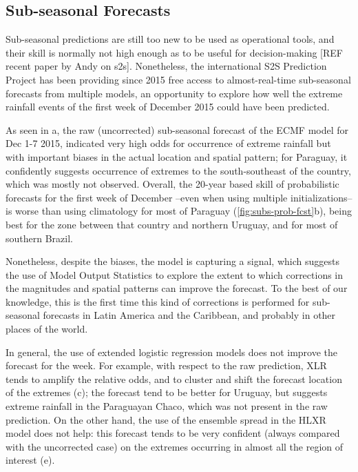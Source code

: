 \documentclass[twocol]{ametsoc}
\begin{document}
\subsection{Sub-seasonal Forecasts}
Sub-seasonal predictions are still too new to be used as operational tools, and their skill is normally not high enough as to be useful for decision-making [REF recent paper by Andy on s2s]. Nonetheless, the international S2S Prediction Project \citep{Vitart2016} has been providing since 2015 free access to almost-real-time sub-seasonal forecasts from multiple models, an opportunity to explore how well the extreme rainfall events of the first week of December 2015 could have been predicted.

As seen in a, the raw (uncorrected) sub-seasonal forecast of the ECMF model for Dec 1-7 2015, indicated very high odds for occurrence of extreme rainfall but with important biases in the actual location and spatial pattern; for Paraguay, it confidently suggests occurrence of extremes to the south-southeast of the country, which was mostly not observed. Overall, the 20-year based skill of probabilistic forecasts for the first week of December --even when using multiple initializations-- is worse than using climatology for most of Paraguay (\cref{fig:subs-prob-fcst}b), being best for the zone between that country and northern Uruguay, and for most of southern Brazil.

Nonetheless, despite the biases, the model is capturing a signal, which suggests the use of Model Output Statistics to explore the extent to which corrections in the magnitudes and spatial patterns can improve the forecast. To the best of our knowledge, this is the first time this kind of corrections is performed for sub-seasonal forecasts in Latin America and the Caribbean, and probably in other places of the world.

In general, the use of extended logistic regression models does not improve the forecast for the week. For example, with respect to the raw prediction, XLR tends to amplify the relative odds, and to cluster and shift the forecast location of the extremes (c); the forecast tend to be better for Uruguay, but suggests extreme rainfall in the Paraguayan Chaco, which was not present in the raw prediction. On the other hand, the use of the ensemble spread in the HLXR model does not help: this forecast tends to be very confident (always compared with the uncorrected case) on the extremes occurring in almost all the region of interest (e).
\end{document}
